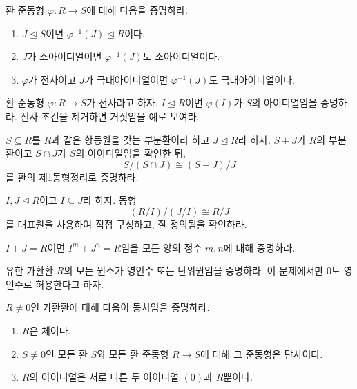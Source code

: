 \begin{exercise}[*]
환 준동형 $\varphi:R\to S$에 대해 다음을 증명하라.
\begin{enumerate}[label=(\alph*)]
  \item $J\trianglelefteq S$이면 $\varphi^{-1}(J)\trianglelefteq R$이다.
  \item $J$가 소아이디얼이면 $\varphi^{-1}(J)$도 소아이디얼이다.
  \item $\varphi$가 전사이고 $J$가 극대아이디얼이면 $\varphi^{-1}(J)$도 극대아이디얼이다.
\end{enumerate}
\end{exercise}

\begin{exercise}
환 준동형 $\varphi:R\to S$가 전사라고 하자. $I\trianglelefteq R$이면 $\varphi(I)$가 $S$의 아이디얼임을 증명하라. 전사 조건을 제거하면 거짓임을 예로 보여라.
\end{exercise}

\begin{exercise}[*]
$S\subseteq R$를 $R$과 같은 항등원을 갖는 부분환이라 하고 $J\trianglelefteq R$라 하자. $S+J$가 $R$의 부분환이고 $S\cap J$가 $S$의 아이디얼임을 확인한 뒤,
\[
  S/(S\cap J)\cong(S+J)/J
\]
를 환의 제1동형정리로 증명하라.
\end{exercise}

\begin{exercise}
$I,J\trianglelefteq R$이고 $I\subseteq J$라 하자. 동형
\[
  (R/I)/(J/I)\cong R/J
\]
를 대표원을 사용하여 직접 구성하고, 잘 정의됨을 확인하라.
\end{exercise}

\begin{exercise}[*]
$I+J=R$이면 $I^m+J^n=R$임을 모든 양의 정수 $m,n$에 대해 증명하라.
\end{exercise}

\begin{exercise}
유한 가환환 $R$의 모든 원소가 영인수 또는 단위원임을 증명하라. 이 문제에서만 $0$도 영인수로 허용한다고 하자.
\end{exercise}

\begin{exercise}[*]
$R\ne0$인 가환환에 대해 다음이 동치임을 증명하라.
\begin{enumerate}[label=(\roman*)]
  \item $R$은 체이다.
  \item $S\ne0$인 모든 환 $S$와 모든 환 준동형 $R\to S$에 대해 그 준동형은 단사이다.
  \item $R$의 아이디얼은 서로 다른 두 아이디얼 $(0)$과 $R$뿐이다.
\end{enumerate}
\end{exercise}


